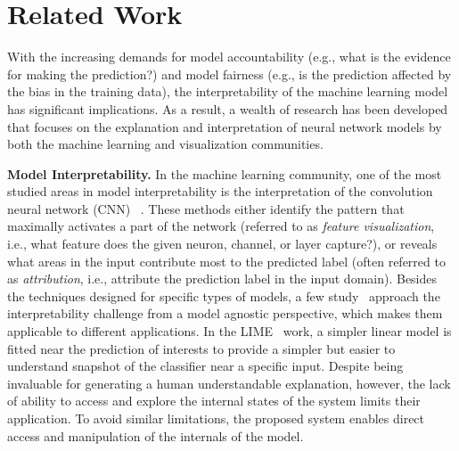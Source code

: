 
\section{Related Work}
With the increasing demands for model accountability (e.g., what is the evidence for making the prediction?) and model fairness (e.g., is the prediction affected by the bias in the training data),
the interpretability of the machine learning model has significant implications. As a result, a wealth of research has been developed that focuses on the explanation and interpretation of neural network models by both the machine learning and visualization communities.

\textbf{Model Interpretability.}
%
In the machine learning community, one of the most studied areas in model interpretability is the interpretation of the convolution neural network (CNN) ~\cite{SimonyanVedaldiZisserman2013, ZeilerFergus2014, YosinskiCluneNguyen2015, OlahMordvintsevSchubert2017, OlahSatyanarayanJohnson2018}.
%
These methods either identify the pattern that maximally activates a part of the network (referred to as \emph{feature visualization}, i.e., what feature does the given neuron, channel, or layer capture?), or reveals what areas in the input contribute most to the predicted label (often referred to as \emph{attribution}, i.e., attribute the prediction label in the input domain).
%
Besides the techniques designed for specific types of models, a few study~\cite{RibeiroSinghGuestrin2016, KrausePererNg2016, LundbergLee2017} approach the interpretability challenge from a model agnostic perspective, which makes them applicable to different applications. In the LIME~\cite{RibeiroSinghGuestrin2016} work, a simpler linear model is fitted near the prediction of interests to provide a simpler but easier to understand snapshot of the classifier near a specific input.
%
Despite being invaluable for generating a human understandable explanation, however, the lack of ability to access and explore the internal states of the system limits their application.
To avoid similar limitations, the proposed system enables direct access and manipulation of the internals of the model.

